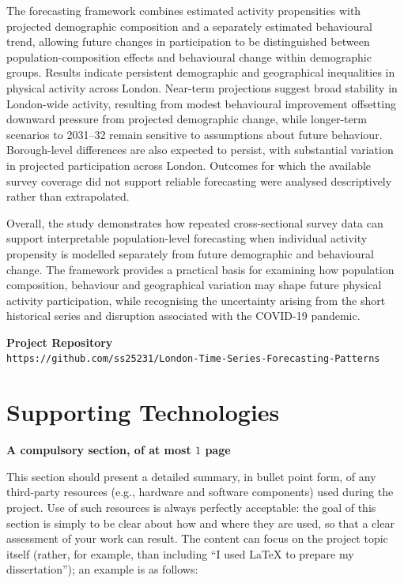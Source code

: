 \documentclass[ %
                    author={Ashrey Ashrey, Sanya Kapoor, Trisha Sharma, Yash Bhooshan Pandloskar},
                supervisor={Dr. Dalila O’Grady},
                    degree={MSc},
                     title={Using machine learning to forecast physical activity participation, volunteering and activity patterns in London},
                  subtitle={},
                      type={},
                      year={2021}]{dissertation}
\begin{document}
The forecasting framework combines estimated activity propensities with projected demographic composition and a separately estimated behavioural trend, allowing future changes in participation to be distinguished between population-composition effects and behavioural change within demographic groups. Results indicate persistent demographic and geographical inequalities in physical activity across London. Near-term projections suggest broad stability in London-wide activity, resulting from modest behavioural improvement offsetting downward pressure from projected demographic change, while longer-term scenarios to 2031--32 remain sensitive to assumptions about future behaviour. Borough-level differences are also expected to persist, with substantial variation in projected participation across London. Outcomes for which the available survey coverage did not support reliable forecasting were analysed descriptively rather than extrapolated.

Overall, the study demonstrates how repeated cross-sectional survey data can support interpretable population-level forecasting when individual activity propensity is modelled separately from future demographic and behavioural change. The framework provides a practical basis for examining how population composition, behaviour and geographical variation may shape future physical activity participation, while recognising the uncertainty arising from the short historical series and disruption associated with the COVID-19 pandemic.

\vspace{1.2cm}

\noindent
\textbf{Project Repository}\\[2pt]
\texttt{https://github.com/ss25231/London-Time-Series-Forecasting-Patterns}





\chapter*{Supporting Technologies}

{\bf A compulsory section, of at most $1$ page}
\vspace{1cm} 

\noindent
This section should present a detailed summary, in bullet point form, 
of any third-party resources (e.g., hardware and software components) 
used during the project.  Use of such resources is always perfectly 
acceptable: the goal of this section is simply to be clear about how
and where they are used, so that a clear assessment of your work can
result.  The content can focus on the project topic itself (rather,
for example, than including ``I used \mbox{\LaTeX} to prepare my 
dissertation''); an example is as follows:
\end{document}
